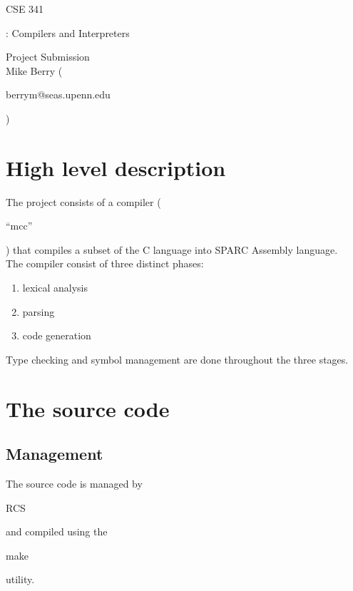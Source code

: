 \setlength{\parindent}{0em}

\begin{center}
{\LARGE \begin{bf}CSE 341\end{bf}: Compilers and Interpreters \\  }
Project Submission \\
Mike Berry (\begin{it}berrym@seas.upenn.edu\end{it}) \\

\end{center}

\section{High level description}

The project consists of a compiler (\begin{it}``mcc''\end{it}) that
compiles a subset of the C language into SPARC Assembly language. \\

The compiler consist of three distinct phases:
\begin{enumerate}

\item lexical analysis

\item parsing

\item code generation
\end{enumerate}

Type checking and symbol management are done throughout the three
stages.

\section{The source code}

\subsection{Management}

The source code is managed by \begin{it}RCS\end{it} and compiled using the
\begin{it}make\end{it} utility.

